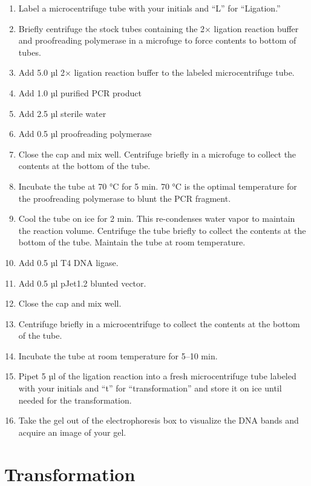 \documentclass[]{book}
\providecommand{\tightlist}{%
  \setlength{\itemsep}{0pt}\setlength{\parskip}{0pt}}
\begin{document}
\begin{enumerate}
\def\labelenumi{\arabic{enumi}.}
\tightlist
\item
  Label a microcentrifuge tube with your initials and ``L'' for
  ``Ligation.''
\item
  Briefly centrifuge the stock tubes containing the 2× ligation reaction
  buffer and proofreading polymerase in a microfuge to force contents to
  bottom of tubes.
\item
  Add 5.0 µl 2× ligation reaction buffer to the labeled microcentrifuge
  tube.
\item
  Add 1.0 µl purified PCR product
\item
  Add 2.5 µl sterile water
\item
  Add 0.5 µl proofreading polymerase
\item
  Close the cap and mix well. Centrifuge briefly in a microfuge to
  collect the contents at the bottom of the tube.
\item
  Incubate the tube at 70 °C for 5 min. 70 °C is the optimal temperature
  for the proofreading polymerase to blunt the PCR fragment.
\item
  Cool the tube on ice for 2 min. This re-condenses water vapor to
  maintain the reaction volume. Centrifuge the tube briefly to collect
  the contents at the bottom of the tube. Maintain the tube at room
  temperature.
\item
  Add 0.5 µl T4 DNA ligase.
\item
  Add 0.5 µl pJet1.2 blunted vector.
\item
  Close the cap and mix well.
\item
  Centrifuge briefly in a microcentrifuge to collect the contents at the
  bottom of the tube.
\item
  Incubate the tube at room temperature for 5--10 min.
\item
  Pipet 5 µl of the ligation reaction into a fresh microcentrifuge tube
  labeled with your initials and ``t'' for ``transformation'' and store
  it on ice until needed for the transformation.
\item
  Take the gel out of the electrophoresis box to visualize the DNA bands
  and acquire an image of your gel.
\end{enumerate}

\section{Transformation}\label{transformation}
\end{document}
